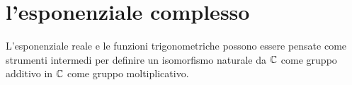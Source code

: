 \begin{comment}
Se ora consideriamo la linea $\vec v = \vec u \circ \arccos^{-1}$
dove $\vec u(x)=(x,\sqrt{1-x^2})$ ci possiamo rendere conto 
che 
\[
 \ell(\vec v\llcorner [0,t])  
 = \ell(\vec u\llcorner[\arccos^{-1} t,\arccos 0])
 = \arccos ()\arccos^{-1} (t)) = t.
\]
Dunque la linea $\vec v\colon[0,\pi]\to\RR^2$ descrive la stessa
semicirconferenza descritta da $\vec u$ ma in senso antiorario 
e in modo tale che l'arco trigonometrico dal punto $(1,0)=\vec v(0)$ 
al punto $\vec v(t)$ ha proprio lunghezza $t$.
Le coordinate $x$ e $y$ del punto $\vec v(t)$ vengono chiamate 
coseno e seno dell'arco di lunghezza $t$%
\mynote{%
La lunghezza dell'arco di raggio $1$ individuato 
da un angolo geometrico si chiama 
misura \emph{in radianti} dell'angolo.
Un radiante è quindi la misura di un angolo 
che individua un arco la cui lunghezza è pari al raggio.
}:
\[
  \vec v(t) = (\cos t, \sin t), \qquad\text{per $t\in[0.\pi]$}.  
\]
Per $t>\pi$ vogliamo estendere la linea $\vec v$ proseguendo 
lungo la semicirconferenza inferiore, ponendo quindi 
\[
  \vec v(t) = (\cos (2\pi - t), -\sin (2\pi - t)), \qquad \text{per $t\in[\pi,2\pi]$}.  
\]
A questo punto abbiamo $\vec v(2 \pi) = (1,0) = \vec v(0)$, la linea si è chiusa 
e possiamo quindi continuare periodicamente ponendo $\vec v(t+2 k \pi) = \vec v(t)$ 
per ogni $k\in \ZZ$ e $t\in[0,2\pi]$.
Questo definisce la linea per ogni $t\in \RR$ e di conseguenza 
definisce le funzioni $\cos t$ e $\sin t$ per ogni $t\in \RR$.
\mynote{
  Formalmente potremmo definire  
  \[
  \cos x = \arccos^{-1}(2\pi\phi(x/2\pi))  
  \]
  dove $\phi(t) =  \frac 1 2 - \abs{t - \lfloor t\rfloor-\frac 1 2}$
  osservando che $\phi(t)$ ha un grafico a \emph{denti di sega}
  con periodo $1$ e in modo simile potremmo 
  definire la funzione $\sin x$.
}
\end{comment}

\section{l'esponenziale complesso}
\label{sec:esponenziale_complesso}%

L'esponenziale reale e le funzioni trigonometriche possono essere pensate 
come strumenti intermedi per definire un isomorfismo naturale 
da ${\mathbb C}$ come gruppo additivo in ${\mathbb C}$ come gruppo moltiplicativo.

